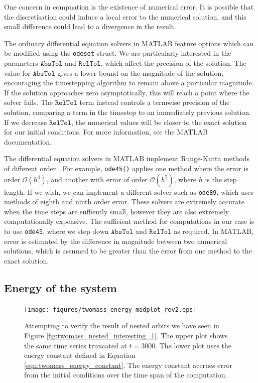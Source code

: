 \documentclass{report}
\begin{document}
One concern in compuation is the existence of numerical error.
It is possible that the discretisation could induce a local error to the numerical solution,
and this small difference could lead to a divergence in the result.

The ordinary differential equation solvers in MATLAB feature options which can be modified using the \texttt{odeset} struct.
We are particularly interested in the parameters $\mathtt{AbsTol}$ and $\mathtt{RelTol}$,
which affect the precision of the solution.
The value for $\mathtt{AbsTol}$ gives a lower bound on the magnitude of the solution,
encouraging the timestepping algorithm to remain above a particular magnitude.
If the solution approaches zero asymptotically,
this will reach a point where the solver fails.
The $\mathtt{RelTol}$ term instead controls a termwise precision of the solution,
comparing a term in the timestep to an immediately previous solution.
If we decrease $\mathtt{RelTol}$,
the numerical values will be closer to the exact solution for our initial conditions.
For more information, see the MATLAB documentation.

The differential equation solvers in MATLAB implement Runge-Kutta methods of different order \cite{moler_2014}.
For example, \texttt{ode45()} applies one method where the error is order $\mathcal{O}(h^4)$,
and another with error of order $\mathcal{O}(h^5)$, where $h$ is the step length.
If we wish, we can implement a different solver such as \texttt{ode89},
which uses methods of eighth and ninth order error.
These solvers are extremely accurate when the time steps are suffiently small,
however they are also extremely computationally expensive.
The sufficient method for computations in our case is to use \texttt{ode45},
where we step down $\mathtt{AbsTol}$ and $\mathtt{RelTol}$ as required.
In MATLAB, error is estimated by the difference in magnitude between two numerical solutions,
which is assumed to be greater than the error from one method to the exact solution. 




\subsection{Energy of the system}

\begin{figure}
    \centering
    \texttt{[image: figures/twomass\_energy\_madplot\_rev2.eps]}
    \caption{
        Attempting to verify the result of nested orbits we have seen in Figure \ref{fig:twomass_nested_interesting_1}.
        The upper plot shows the same time series truncated at $t=3000$.
        The lower plot uses the energy constant defined in Equation \ref{eqn:twomass_energy_constant}.
        The energy constant accrues error from the initial conditions over the time span of the computation.
    }
    \label{fig:twomass_energy_madplot}
\end{figure}
\end{document}
